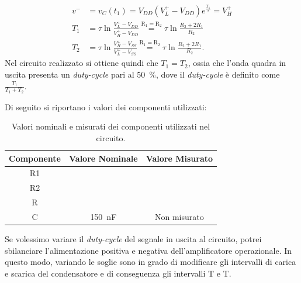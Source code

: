 \begin{equation}
	\begin{split}
		v^-&=v_C(t_1)=V_{DD}(V_L^+-V_{DD})e^{\frac{T_1}{\tau}}=V_H^+ \\
		T_1&=\tau \ln{\frac{V_L^+-V_{DD}}{V_H^+-V_{DD}}}\overset{\mathrm{R_1=R_2}}{=}\tau \ln{\frac{R_2+2R_1}{R_2}} \\
		T_2&=\tau \ln{\frac{V_H^+-V_{SS}}{V_L^+-V_{SS}}}\overset{\mathrm{R_1=R_2}}{=}\tau \ln{\frac{R_2+2R_1}{R_2}}.
	\end{split}
\end{equation}
Nel circuito realizzato si ottiene quindi che $T_1=T_2$, ossia che l'onda quadra in uscita presenta un \textit{duty-cycle} pari al \SI{50}{\percent}, dove il \textit{duty-cycle} è definito come $\frac{T_1}{T_1+T_2}$.

\noindent
Di seguito si riportano i valori dei componenti utilizzati: 

\def\arraystretch{1.3}
\begin{table}[h]
	\centering
	\begin{tabular}{|c|c|c|}
		\hline
		Componente	& Valore Nominale & Valore Misurato \\ \hline
		R1 & & \\ \hline
		R2 & & \\ \hline
		R & & \\ \hline
		C & \SI{150}{\nano\farad} & Non misurato \\ \hline
	\end{tabular}
	\caption{Valori nominali e misurati dei componenti utilizzati nel circuito.}
	\label{tab:valori_componenti_3}
\end{table}

\noindent
Se volessimo variare il \textit{duty-cycle} del segnale in uscita al circuito, potrei sbilanciare l'alimentazione positiva e negativa dell'amplificatore operazionale. In questo modo, variando le soglie sono in grado di modificare gli intervalli di carica e scarica del condensatore e di conseguenza gli intervalli T e T.


